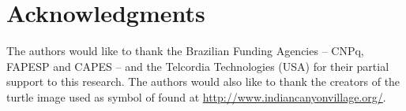 \section*{Acknowledgments}
The authors would like to thank the Brazilian Funding Agencies --
CNPq, FAPESP and CAPES -- and the Telcordia Technologies (USA) for
their partial support to this research. The authors would also
like to thank the creators of the turtle image used as symbol of
\toolname found at \url{http://www.indiancanyonvillage.org/}.
